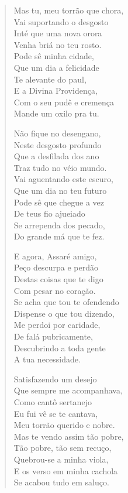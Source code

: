 \begin{verse}
Mas tu, meu torrão que chora,\\
Vai suportando o desgosto\\
Inté que uma nova orora\\
Venha briá no teu rosto.\\
Pode sê minha cidade,\\
Que um dia a felicidade\\
Te alevante do paul,\\
E a Divina Providença,\\
Com o seu pudê e cremença\\
Mande um oxilo pra tu.

Não fique no desengano,\\
Neste desgosto profundo\\
Que a desfilada dos ano\\
Traz tudo no véio mundo.\\
Vai aguentando este escuro,\\
Que um dia no teu futuro\\
Pode sê que chegue a vez\\
De teus fio ajueiado\\
Se arrependa dos pecado,\\
Do grande má que te fez.

E agora, Assaré amigo,\\
Peço descurpa e perdão\\
Destas coisas que te digo\\
Com pesar no coração.\\
Se acha que tou te ofendendo\\
Dispense o que tou dizendo,\\
Me perdoi por caridade,\\
De falá pubricamente,\\
Descubrindo a toda gente\\
A tua necessidade.

Satisfazendo um desejo\\
Que sempre me acompanhava,\\
Como cantô sertanejo\\
Eu fui vê se te cantava,\\
Meu torrão querido e nobre.\\
Mas te vendo assim tão pobre,\\
Tão pobre, tão sem recuço,\\
Quebrou-se a minha viola,\\
E os verso em minha cachola\\
Se acabou tudo em saluço.
\end{verse}

